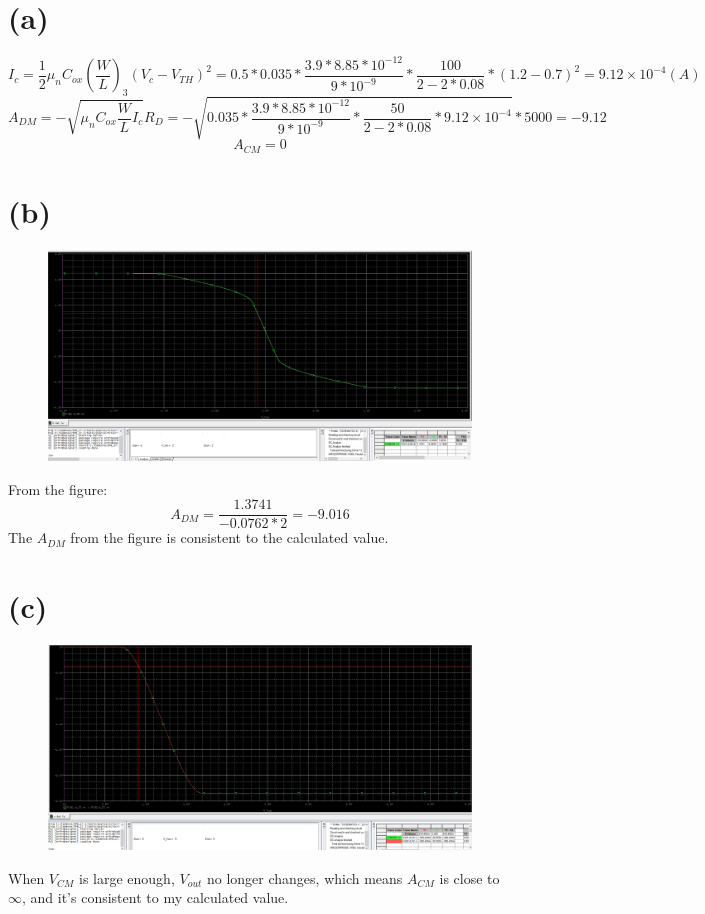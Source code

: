 \documentclass[12pt]{article}
\begin{document}
\newpage
\section{(a)}
$$I_c=\frac{1}{2}\mu_nC_{ox}(\frac{W}{L})_3(V_c-V_{TH})^2=0.5*0.035*\frac{3.9*8.85*10^{-12}}{9*10^{-9}}*\frac{100}{2-2*0.08}*(1.2-0.7)^2=9.12\times10^{-4}(A)$$
$$A_{DM}=-\sqrt{\mu_nC_{ox}\frac{W}{L}I_c}R_D=-\sqrt{0.035*\frac{3.9*8.85*10^{-12}}{9*10^{-9}}*\frac{50}{2-2*0.08}*9.12\times10^{-4}}*5000=-9.12$$
$$A_{CM}=0$$
\section{(b)}
\begin{figure}[H]
\centering
\includegraphics[scale=0.27]{P1.png}
\end{figure}
From the figure:
$$A_{DM}=\frac{1.3741}{-0.0762*2}=-9.016$$
The $A_{DM}$ from the figure is consistent to the calculated value.
\section{(c)}
\begin{figure}[H]
\centering
\includegraphics[scale=0.27]{P2.png}
\end{figure}
When $V_{CM}$ is large enough, $V_{out}$ no longer changes, which means $A_{CM}$ is close to $\infty$, and it's consistent to my calculated value.
\end{document}

